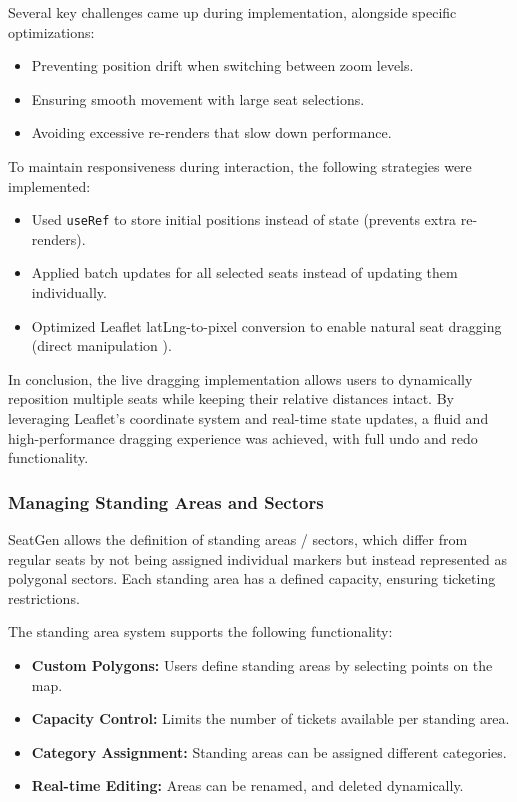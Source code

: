 Several key challenges came up during implementation, alongside specific optimizations:
\begin{itemize}
    \item Preventing position drift when switching between zoom levels.
    \item Ensuring smooth movement with large seat selections.
    \item Avoiding excessive re-renders that slow down performance.
\end{itemize}

To maintain responsiveness during interaction, the following strategies were implemented:
\begin{itemize}
    \item Used \texttt{useRef} to store initial positions instead of state (prevents extra re-renders).
    \item Applied batch updates for all selected seats instead of updating them individually.
    \item Optimized Leaflet latLng-to-pixel conversion to enable natural seat dragging (direct manipulation \cite{Hutchins01121985}).
\end{itemize}

In conclusion, the live dragging implementation allows users to dynamically reposition multiple seats while keeping their relative distances intact. By leveraging Leaflet’s coordinate system and real-time state updates, a fluid and high-performance dragging experience was achieved, with full undo and redo functionality.

\subsubsection{Managing Standing Areas and Sectors}

SeatGen allows the definition of standing areas / sectors, which differ from regular seats by not being assigned individual markers but instead represented as polygonal sectors. Each standing area has a defined capacity, ensuring ticketing restrictions.

The standing area system supports the following functionality:
\begin{itemize}
    \item \textbf{Custom Polygons:} Users define standing areas by selecting points on the map.
    \item \textbf{Capacity Control:} Limits the number of tickets available per standing area.
    \item \textbf{Category Assignment:} Standing areas can be assigned different categories.
    \item \textbf{Real-time Editing:} Areas can be renamed, and deleted dynamically.
\end{itemize}

